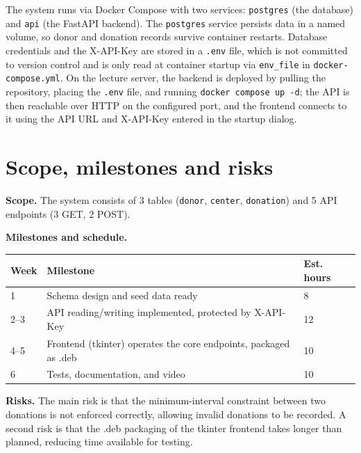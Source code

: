 \documentclass[11pt,a4paper]{article}
\begin{document}
The system runs via Docker Compose with two services: \texttt{postgres} (the
database) and \texttt{api} (the FastAPI backend). The \texttt{postgres}
service persists data in a named volume, so donor and donation records
survive container restarts. Database credentials and the X-API-Key are
stored in a \texttt{.env} file, which is not committed to version control and
is only read at container startup via \texttt{env\_file} in
\texttt{docker-compose.yml}. On the lecture server, the backend is deployed
by pulling the repository, placing the \texttt{.env} file, and running
\texttt{docker compose up -d}; the API is then reachable over HTTP on the
configured port, and the frontend connects to it using the API URL and
X-API-Key entered in the startup dialog.


\section{Scope, milestones and risks}

\textbf{Scope.} The system consists of 3 tables (\texttt{donor},
\texttt{center}, \texttt{donation}) and 5 API endpoints (3 GET, 2 POST).

\textbf{Milestones and schedule.}

\begin{center}
\renewcommand{\arraystretch}{1.2}
\begin{tabularx}{0.95\linewidth}{@{}p{1.2cm}p{8cm}p{1.8cm}@{}}
\toprule
\textbf{Week} & \textbf{Milestone} & \textbf{Est. hours} \\
\midrule
1 & Schema design and seed data ready & 8 \\
2--3 & API reading/writing implemented, protected by X-API-Key & 12 \\
4--5 & Frontend (tkinter) operates the core endpoints, packaged as .deb & 10 \\
6 & Tests, documentation, and video & 10 \\
\bottomrule
\end{tabularx}
\end{center}

\textbf{Risks.} The main risk is that the minimum-interval constraint between
two donations is not enforced correctly, allowing invalid donations to be
recorded. A second risk is that the .deb packaging of the tkinter frontend
takes longer than planned, reducing time available for testing.
\end{document}

